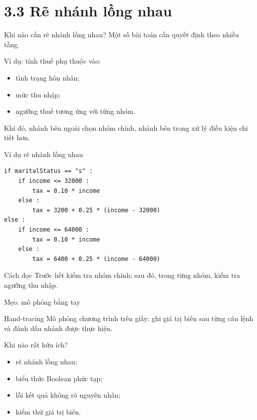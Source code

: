 \documentclass[aspectratio=169,11pt]{beamer}
\newcommand{\smallgap}{\vspace{0.4em}}
\begin{document}
\section{3.3 Rẽ nhánh lồng nhau}

\begin{frame}{Khi nào cần rẽ nhánh lồng nhau?}
Một số bài toán cần quyết định theo nhiều tầng.\smallgap

Ví dụ: tính thuế phụ thuộc vào:
\begin{itemize}
  \item tình trạng hôn nhân;
  \item mức thu nhập;
  \item ngưỡng thuế tương ứng với từng nhóm.
\end{itemize}
\smallgap
Khi đó, nhánh bên ngoài chọn nhóm chính, nhánh bên trong xử lý điều kiện chi tiết hơn.
\end{frame}

\begin{frame}[fragile]{Ví dụ rẽ nhánh lồng nhau}
\begin{lstlisting}[style=py]
if maritalStatus == "s" :
    if income <= 32000 :
        tax = 0.10 * income
    else :
        tax = 3200 + 0.25 * (income - 32000)
else :
    if income <= 64000 :
        tax = 0.10 * income
    else :
        tax = 6400 + 0.25 * (income - 64000)
\end{lstlisting}
\begin{block}{Cách đọc}
Trước hết kiểm tra nhóm chính; sau đó, trong từng nhóm, kiểm tra ngưỡng thu nhập.
\end{block}
\end{frame}

\begin{frame}{Mẹo: mô phỏng bằng tay}
\begin{block}{Hand-tracing}
Mô phỏng chương trình trên giấy: ghi giá trị biến sau từng câu lệnh và đánh dấu nhánh được thực hiện.
\end{block}
\begin{exampleblock}{Khi nào rất hữu ích?}
\begin{itemize}
  \item rẽ nhánh lồng nhau;
  \item biểu thức Boolean phức tạp;
  \item lỗi kết quả không rõ nguyên nhân;
  \item kiểm thử giá trị biên.
\end{itemize}
\end{exampleblock}
\end{frame}
\end{document}
